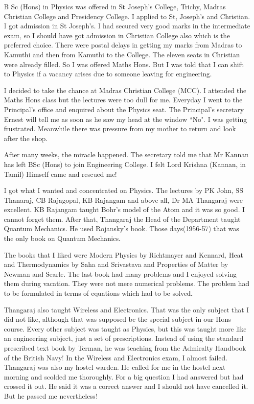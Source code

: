 \vspace{-.2cm}

B Sc (Hons) in Physics was offered in St Joseph's College, Trichy, 
Madras Christian College and Presidency College. I applied to St, 
Joseph's and Christian. I got admission in St Joseph's. I had secured 
very good marks in the intermediate exam, so I should have got admission 
in Christian College also which is the preferred choice.  There were 
postal delays in getting my marks from Madras to Kamuthi and then from 
Kamuthi to the College. The eleven seats in Christian were already 
filled. So I was offered Maths Hons. But I was told that I can shift to 
Physics if a vacancy arises due to someone leaving for engineering.

I decided to take the chance at Madras Christian College (MC\-C). I 
attended the Maths Hons class but the lectures were too dull for me. 
Everyday I went to the Principal's office and enquired about the Physics 
seat. The Principal's secretary Ernest will tell me as soon as he saw my 
head at the window ``No". I was getting frustrated. Meanwhile there was 
pressure from my mother to return and look after the shop.

After many weeks, the miracle happened. The secretary told me that Mr 
Kannan has left BSc (Hons) to join Engineering Co\-llege. I felt Lord 
Krishna (Kannan, in Tamil) Himself came and rescued me!

I got what I wanted and concentrated on Physics. The lectures by PK 
John, SS Thanaraj, CB Rajagopal, KB Rajangam and above all, Dr MA 
Thangaraj were excellent. KB Rajangam taught Bohr's model of the Atom 
and it was so good. I cannot forget them. After that, Thangaraj the Head 
of the Department taught Quantum Mechanics. He used Rojansky's book. 
Those days(1956-57) that was the only book on Quantum Mechanics.

The books that I liked were Modern Physics by Richtmayer and Kennard, 
Heat and Thermodynamics by Saha and Srivastava and Properties of Matter 
by Newman and Searle. The last book had many problems and I enjoyed 
solving them during vacation. They were not mere numerical problems. The 
problem had to be formulated in terms of equations which had to be 
solved.

Thangaraj also taught Wireless and Electronics. That was the only 
subject that I did not like, although that was supposed be the special 
subject in our Hons course. Every other subject was taught as Physics, 
but this was taught more like an enginee\-ring subject, just a set of 
prescriptions. Instead of using the standard prescribed text book by 
Terman, he was teaching from the Admira\-lty Handbook of the British Navy! 
In the Wireless and Electronics exam, I almost failed. Thangaraj was 
also my hostel warden. He called for me in the hostel next morning and 
scolded me thoroughly. For a big question I had answered but had crossed 
it out. He said it was a correct answer and I should not have cancelled 
it. But he passed me nevertheless!

